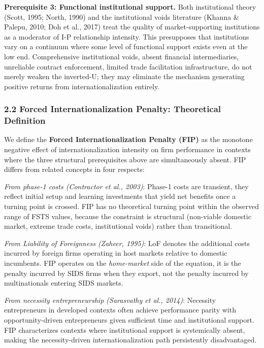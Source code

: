 \documentclass[
  12pt,a4paper]{article}
\begin{document}
\textbf{Prerequisite 3: Functional institutional support.} Both
institutional theory (Scott, 1995; North, 1990) and the institutional
voids literature (Khanna \& Palepu, 2010; Doh et al., 2017) treat the
quality of market-supporting institutions as a moderator of I-P
relationship intensity. This presupposes that institutions vary on a
continuum where some level of functional support exists even at the low
end. Comprehensive institutional voids, absent financial intermediaries,
unreliable contract enforcement, limited trade facilitation
infrastructure, do not merely weaken the inverted-U; they may eliminate
the mechanism generating positive returns from internationalization
entirely.

\hypertarget{forced-internationalization-penalty-theoretical-definition}{%
\subsubsection{2.2 Forced Internationalization Penalty: Theoretical
Definition}\label{forced-internationalization-penalty-theoretical-definition}}

We define the \textbf{Forced Internationalization Penalty (FIP)} as the
monotone negative effect of internationalization intensity on firm
performance in contexts where the three structural prerequisites above
are simultaneously absent. FIP differs from related concepts in four
respects:

\emph{From phase-1 costs (Contractor et al., 2003)}: Phase-1 costs are
transient, they reflect initial setup and learning investments that
yield net benefits once a turning point is crossed. FIP has no
theoretical turning point within the observed range of FSTS values,
because the constraint is structural (non-viable domestic market,
extreme trade costs, institutional voids) rather than transitional.

\emph{From Liability of Foreignness (Zaheer, 1995)}: LoF denotes the
additional costs incurred by foreign firms operating in host markets
relative to domestic incumbents. FIP operates on the \emph{home-market}
side of the equation, it is the penalty incurred by SIDS firms when they
export, not the penalty incurred by multinationals entering SIDS
markets.

\emph{From necessity entrepreneurship (Sarasvathy et al., 2014)}:
Necessity entrepreneurs in developed contexts often achieve performance
parity with opportunity-driven entrepreneurs given sufficient time and
institutional support. FIP characterizes contexts where institutional
support is systemically absent, making the necessity-driven
internationalization path persistently disadvantaged.
\end{document}

